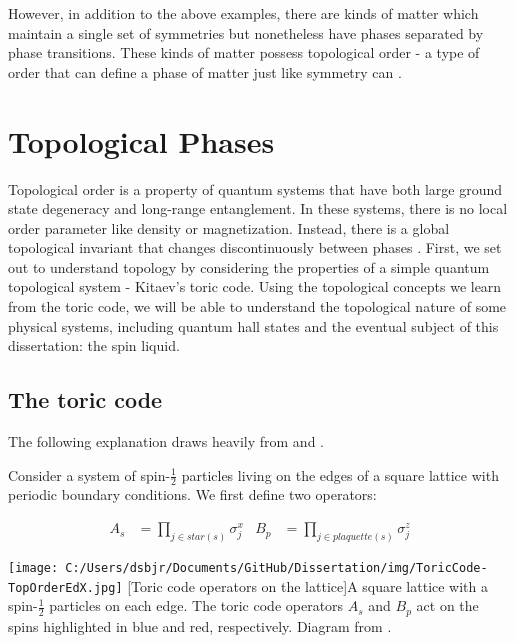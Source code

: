 However, in addition to the above examples, there are kinds of matter which maintain a single set of symmetries but nonetheless have phases separated by phase transitions. These kinds of matter possess topological order - a type of order that can define a phase of matter just like symmetry can \cite{Wen1990}.

\section{Topological Phases}

Topological order is a property of quantum systems that have both large ground state degeneracy and long-range entanglement. In these systems, there is no local order parameter like density or magnetization. Instead, there is a global topological invariant that changes discontinuously between phases \cite{Wen2017}. First, we set out to understand topology by considering the properties of a simple quantum topological system - Kitaev's toric code. Using the topological concepts we learn from the toric code, we will be able to understand the topological nature of some physical systems, including quantum hall states and the eventual subject of this dissertation: the spin liquid.

\subsection{The toric code}

The following explanation draws heavily from \cite{Kitaev2003} and \cite{topOrderEdX}.

Consider a system of spin-$\frac{1}{2}$ particles living on the edges of a square lattice with periodic boundary conditions. We first define two operators:

\begin{align*}
A_s&=\prod_{j \in star(s)} \sigma^{x}_{j} 		& B_{p}&=\prod_{j \in plaquette(s)} \sigma^{z}_{j}
\end{align*}

\begin{centering}
\texttt{[image: C:/Users/dsbjr/Documents/GitHub/Dissertation/img/ToricCode-TopOrderEdX.jpg]}
  \captionsetup{width=0.9\textwidth}
  [Toric code operators on the lattice]{A square lattice with a spin-$\frac{1}{2}$ particles on each edge. The toric code operators $A_{s}$ and $B_{p}$ act on the spins highlighted in blue and red, respectively. Diagram from \cite{topOrderEdX}.}
  \label{fig:toricCode1}
\end{centering}

